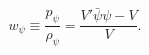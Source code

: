 \begin{equation}\label{eq:w}
  w_\psi\equiv\frac{p_\psi}{\rho_\psi}=\frac{V' \bar{\psi}{\psi}-V}{V}.
\end{equation}

